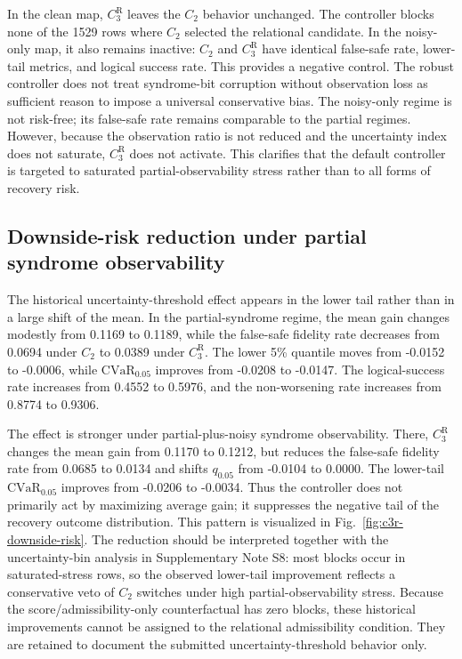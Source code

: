 \documentclass{iopjournal}
\begin{document}
In the clean map, $C_3^{\mathrm R}$ leaves the $C_2$ behavior unchanged. The
controller blocks none of the 1529 rows where $C_2$ selected the relational
candidate. In the noisy-only map, it also remains inactive: $C_2$ and
$C_3^{\mathrm R}$ have identical false-safe rate, lower-tail metrics, and logical
success rate. This provides a negative control. The robust controller does not
treat syndrome-bit corruption without observation loss as sufficient reason to
impose a universal conservative bias.
The noisy-only regime is not risk-free; its false-safe rate remains comparable to
the partial regimes. However, because the observation ratio is not reduced and the
uncertainty index does not saturate, $C_3^{\mathrm R}$ does not activate. This
clarifies that the default controller is targeted to saturated
partial-observability stress rather than to all forms of recovery risk.

\FloatBarrier

\subsection{Downside-risk reduction under partial syndrome observability}
\label{subsec:results-downside-risk}

The historical uncertainty-threshold effect appears in the lower tail rather than
in a large shift of the mean. In the partial-syndrome regime, the mean gain changes
modestly from 0.1169 to 0.1189, while the false-safe fidelity rate decreases from
0.0694 under $C_2$ to 0.0389 under $C_3^{\mathrm R}$. The lower 5\% quantile moves
from -0.0152 to -0.0006, while $\mathrm{CVaR}_{0.05}$ improves from -0.0208 to
-0.0147. The logical-success rate increases from 0.4552 to 0.5976, and the
non-worsening rate increases from 0.8774 to 0.9306.

The effect is stronger under partial-plus-noisy syndrome observability. There,
$C_3^{\mathrm R}$ changes the mean gain from 0.1170 to 0.1212, but reduces the
false-safe fidelity rate from 0.0685 to 0.0134 and shifts $q_{0.05}$ from -0.0104
to 0.0000. The lower-tail $\mathrm{CVaR}_{0.05}$ improves from -0.0206 to -0.0034.
Thus the controller does not primarily act by maximizing average gain; it
suppresses the negative tail of the recovery outcome distribution. This pattern is visualized in
Fig.~\ref{fig:c3r-downside-risk}.
The reduction should be interpreted together with the uncertainty-bin analysis in
Supplementary Note S8: most blocks occur in saturated-stress rows, so the observed
lower-tail improvement reflects a conservative veto of $C_2$ switches under high
partial-observability stress.
Because the score/admissibility-only counterfactual has zero blocks, these
historical improvements cannot be assigned to the relational admissibility
condition.  They are retained to document the submitted uncertainty-threshold
behavior only.
\end{document}
